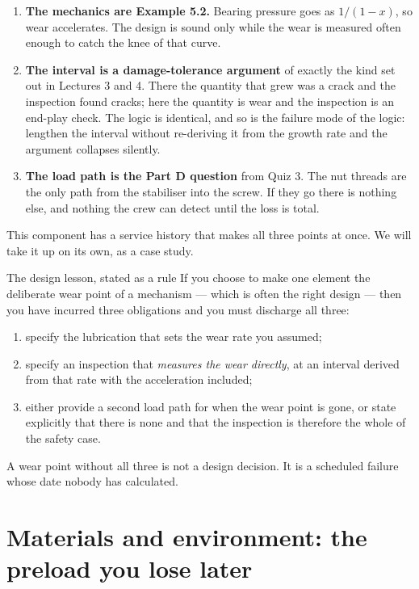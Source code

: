 \documentclass[11pt,a4paper]{article}
\begin{document}
\begin{enumerate}[nosep,leftmargin=1.5em]
  \item \textbf{The mechanics are Example 5.2.} Bearing pressure goes as $1/(1-x)$, so wear accelerates.
        The design is sound only while the wear is measured often enough to catch the knee of that curve.
  \item \textbf{The interval is a damage-tolerance argument} of exactly the kind set out in Lectures 3
        and 4. There the quantity that grew was a crack and the inspection found cracks; here the
        quantity is wear and the inspection is an end-play check. The logic is identical, and so is the
        failure mode of the logic: lengthen the interval without re-deriving it from the growth rate
        and the argument collapses silently.
  \item \textbf{The load path is the Part D question} from Quiz 3. The nut threads are the only path
        from the stabiliser into the screw. If they go there is nothing else, and nothing the crew can
        detect until the loss is total.
\end{enumerate}

\medskip
\noindent This component has a service history that makes all three points at once. We will take it up
on its own, as a case study.

\begin{keybox}{The design lesson, stated as a rule}
If you choose to make one element the deliberate wear point of a mechanism --- which is often the right
design --- then you have incurred three obligations and you must discharge all three:
\begin{enumerate}[nosep]
  \item specify the lubrication that sets the wear rate you assumed;
  \item specify an inspection that \emph{measures the wear directly}, at an interval derived from that
        rate with the acceleration included;
  \item either provide a second load path for when the wear point is gone, or state explicitly that
        there is none and that the inspection is therefore the whole of the safety case.
\end{enumerate}
A wear point without all three is not a design decision. It is a scheduled failure whose date nobody
has calculated.
\end{keybox}

\section{Materials and environment: the preload you lose later}
\label{sec:environment}
\end{document}
